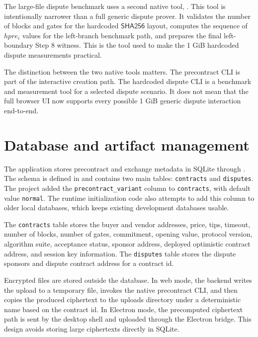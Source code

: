 The large-file dispute benchmark uses a second native tool,
. This tool is intentionally narrower
than a full generic dispute prover. It validates the number of blocks and gates for the
hardcoded \(\mathsf{SHA256}\) layout, computes the sequence of \(hpre_i\) values for the
left-branch benchmark path, and prepares the final left-boundary Step 8 witness. This is the
tool used to make the 1 GiB hardcoded dispute measurements practical.

The distinction between the two native tools matters. The precontract CLI is part of the
interactive creation path. The hardcoded dispute CLI is a benchmark and measurement tool for
a selected dispute scenario. It does not mean that the full browser UI now supports every
possible 1 GiB generic dispute interaction end-to-end.

\section{Database and artifact management}

The application stores precontract and exchange metadata in SQLite through
. The schema is defined in  and
contains two main tables: \texttt{contracts} and \texttt{disputes}. The project added the
\texttt{precontract\_variant} column to \texttt{contracts}, with default value
\texttt{normal}. The runtime initialization code also attempts to add this column to older
local databases, which keeps existing development databases usable.

The \texttt{contracts} table stores the buyer and vendor addresses, price, tips, timeout,
number of blocks, number of gates, commitment, opening value, protocol version, algorithm
suite, acceptance status, sponsor address, deployed optimistic contract address, and session
key information. The \texttt{disputes} table stores the dispute sponsors and dispute
contract address for a contract id.

Encrypted files are stored outside the database. In web mode, the backend writes the upload
to a temporary file, invokes the native precontract CLI, and then copies the produced
ciphertext to the uploads directory under a deterministic name based on the contract id. In
Electron mode, the precomputed ciphertext path is sent by the desktop shell and uploaded
through the Electron bridge. This design avoids storing large ciphertexts directly in
SQLite.

